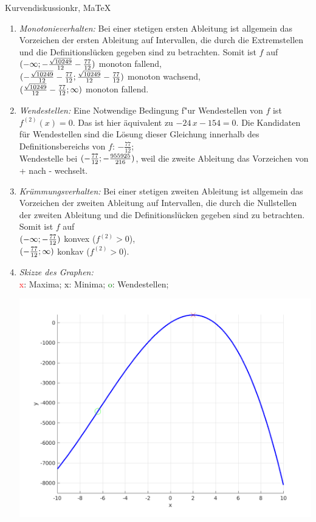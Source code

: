 \begin{MAufgabe}{Kurvendiskussion}{kr, MaTeX}
\begin{enumerate}
 \item \emph{Monotonieverhalten:} 
 Bei einer stetigen ersten Ableitung ist allgemein das Vorzeichen der ersten Ableitung auf Intervallen, die durch die Extremstellen und die Definitionsl\"ucken gegeben sind zu betrachten. Somit ist $f$ auf \\ 
 $(-\infty; - \frac{\sqrt{10249}}{12} - \frac{77}{12})$ monoton fallend, \\ 
 $( - \frac{\sqrt{10249}}{12} - \frac{77}{12};\frac{\sqrt{10249}}{12} - \frac{77}{12})$ monoton  wachsend, \\ 
 $(\frac{\sqrt{10249}}{12} - \frac{77}{12}; \infty)$ monoton fallend. \\ 
 \item \emph{Wendestellen:} 
 Eine Notwendige Bedingung f"ur Wendestellen von $f$ ist $f^{(2)}(x)=0$. 
 Das ist hier \"aquivalent zu $ - 24\, x - 154=0$. 
 Die Kandidaten f\"ur Wendestellen sind die L\"osung dieser Gleichung innerhalb des Definitionsbereichs von $f$: $- \frac{77}{12}$; \\ 
 Wendestelle bei $(- \frac{77}{12};- \frac{955925}{216})$, weil die zweite Ableitung das Vorzeichen von + nach - wechselt. \\ 
 \item \emph{Kr\"ummungsverhalten:} 
 Bei einer stetigen zweiten Ableitung ist allgemein das Vorzeichen der zweiten Ableitung auf Intervallen, die durch die Nullstellen der zweiten Ableitung und die Definitionsl\"ucken gegeben sind zu betrachten. 
 Somit ist $f$ auf \\ 
 $(-\infty ;- \frac{77}{12})$  konvex ($f^{(2)}>0$), \\ 
 $(- \frac{77}{12}; \infty)$  konkav ($f^{(2)}>0$). \\ 
 \item \emph{Skizze des Graphen:} \\ 
 {\textcolor{red} x}: Maxima; {\textcolor{black} x}: Minima; {\textcolor{green} o}: Wendestellen; 
  \begin{center}
  \includegraphics[width=0.8\linewidth]{Abb_zur_Ag_autogenerated_fractions_4.png} \end{center}
  
 \end{enumerate}
 \else\relax\fi
  \end{MAufgabe}